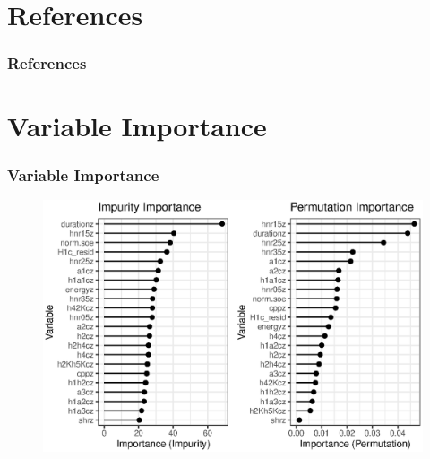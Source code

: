 \documentclass{beamer}
\begin{document}
\appendix
\section{References}
\begin{frame}[t,allowframebreaks]
  \frametitle{References}
    \printbibliography
\end{frame}

\section{Variable Importance}
\begin{frame}
  \frametitle{Variable Importance}
  \begin{figure}[h!]
    \centering
    \includegraphics[width = 0.8\linewidth]{images/RandomForest/rf_dur_plots.eps}
  \end{figure}
\end{frame}
\end{document}

